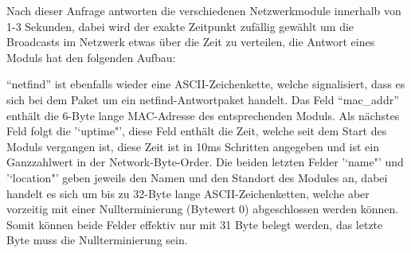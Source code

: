 \documentclass[a4paper,14pt,headsepline]{scrartcl}
\begin{document}
Nach dieser Anfrage antworten die verschiedenen Netzwerkmodule innerhalb von 1-3 Sekunden, dabei wird der exakte Zeitpunkt zufällig gewählt um die Broadcasts im Netzwerk etwas über die Zeit zu verteilen, die Antwort eines Moduls hat den folgenden Aufbau:
\begin{figure}[h]
\begin{center}
\end{center}
\end{figure}

\newpage

"`netfind"' ist ebenfalls wieder eine ASCII-Zeichenkette, welche signalisiert, dass es sich bei dem Paket um ein netfind-Antwortpaket handelt. Das Feld "`mac\_addr"' enthält die 6-Byte lange MAC-Adresse des entsprechenden Moduls. Als nächstes Feld folgt die '`uptime"', diese Feld enthält die Zeit, welche seit dem Start des Moduls vergangen ist, diese Zeit ist in 10ms Schritten angegeben und ist ein Ganzzahlwert in der Network-Byte-Order. Die beiden letzten Felder '`name"' und '`location"' geben jeweils den Namen und den Standort des Modules an, dabei handelt es sich um bis zu 32-Byte lange ASCII-Zeichenketten, welche aber vorzeitig mit einer Nullterminierung (Bytewert 0) abgeschlossen werden können. Somit können beide Felder effektiv nur mit 31 Byte belegt werden, das letzte Byte muss die Nullterminierung sein.
\end{document}
